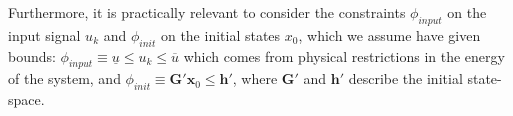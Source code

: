 \documentclass[sigconf]{llncs}
\newcommand{\mat}[1]{\boldsymbol{#1}}
\renewcommand{\vec}[1]{\boldsymbol{#1}}
\begin{document}


Furthermore, it is practically relevant to consider the 
constraints $\phi_\mathit{input}$ on the input
signal $u_{k}$ and $\phi_\mathit{init}$ on the initial states $x_0$,
which we assume have given bounds:
$\phi_\mathit{input}\equiv \underline{u} \leq u_k \leq \overline{u}$
which comes from physical restrictions in the energy of the system, and
$\phi_\mathit{init}\equiv \mat{G}' \vec{x}_0 \leq \vec{h}'$,
where $\mat{G}'$ and $\vec{h}'$ describe the initial state-space.

%
%
\end{document}

